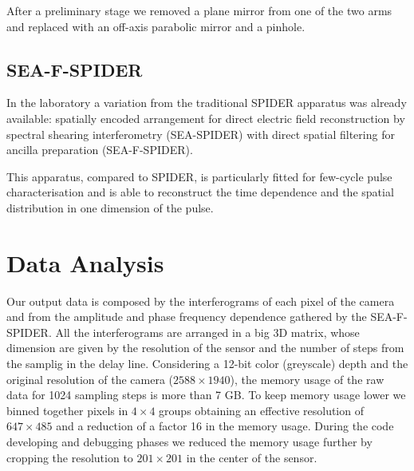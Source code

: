 \documentclass[12pt,a4paper,twoside]{article}
\begin{document}
After a preliminary stage we removed a plane mirror from one of the two arms and replaced with an off-axis parabolic mirror and a pinhole.


\subsection{SEA-F-SPIDER}
In the laboratory a variation from the traditional SPIDER apparatus was already available: spatially encoded arrangement for direct electric field reconstruction by spectral shearing interferometry (SEA-SPIDER) with direct spatial filtering for ancilla preparation (SEA-F-SPIDER).

This apparatus, compared to SPIDER, is particularly fitted for few-cycle pulse characterisation and is able to reconstruct the time dependence and the spatial distribution in one dimension of the pulse.

\clearpage
\section{Data Analysis}
\label{sec_data_analysis}
Our output data is composed by the interferograms of each pixel of the camera and from the amplitude and phase frequency dependence gathered by the SEA-F-SPIDER.
All the interferograms are arranged in a big 3D matrix, whose dimension are given by the resolution of the sensor and the number of steps from the samplig in the delay line.
Considering a 12-bit color (greyscale) depth and the original resolution of the camera ($2588\times 1940$), the memory usage of the raw data for 1024 sampling steps is more than 7 GB.
To keep memory usage lower we binned together pixels in $4\times 4$ groups obtaining an effective resolution of $647\times 485$ and a reduction of a factor 16 in the memory usage.
During the code developing and debugging phases we reduced the memory usage further by cropping the resolution to $201\times 201$ in the center of the sensor.
\end{document}
